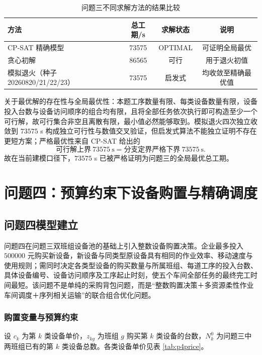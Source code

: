 \documentclass[12pt,a4paper]{article}
\begin{document}
\begin{table}[H]
\centering
\caption{问题三不同求解方法的结果比较}
\small
\label{tab:p3compare}
\begin{tabular}{lccc}
\toprule
方法 & 总工期/s & 求解状态 & 说明 \\
\midrule
CP-SAT 精确模型 & 73575 & OPTIMAL & 可证明全局最优 \\
贪心初解 & 86565 & 可行 & 用于退火初值 \\
模拟退火（种子 20260820/21/22/23） & 73575 & 启发式 & 均收敛至精确最优值 \\
\bottomrule
\end{tabular}
\end{table}

关于最优解的存在性与全局最优性：本题工序数量有限、每类设备数量有限，设备投入台数与设备访问顺序的组合均有限，且将全部任务依次执行即可构造至少一个可行解，故可行集合非空且离散有限，最小值必然能够取到。模拟退火四次独立收敛到 $73575$ s 构成独立可行性与数值交叉验证，但启发式算法不能独立证明不存在更短方案；严格最优性来自 CP-SAT 给出的
\begin{equation}
\text{可行解上界}\ 73575\ \text{s}=\text{分支定界严格下界}\ 73575\ \text{s}.
\end{equation}
故在当前建模口径下，$73575$ s 已被严格证明为问题三的全局最优总工期。

\section{问题四：预算约束下设备购置与精确调度}

\subsection{问题四模型建立}

问题四在问题三双班组设备池的基础上引入整数设备购置决策。企业最多投入 $500000$ 元购买新设备，新设备与同类型原设备具有相同的作业效率、移动速度与使用规则；需同时决定各类型设备的购买数量与所属班组、每道工序的投入台数、具体设备编号、设备访问顺序及工序起止时刻，使五个车间全部任务的最终完工时间最短。该问题不是单纯的采购背包问题，而是“整数购置决策＋多资源柔性作业车间调度＋序列相关运输”的联合组合优化问题。

\subsubsection{购置变量与预算约束}

设 $c_k$ 为第 $k$ 类设备单价，$z_{kg}$ 为班组 $g$ 购买第 $k$ 类设备的台数，$N_k^0$ 为问题三中两班组已有的第 $k$ 类设备总数。各类设备单价见表 \ref{tab:p4price}。
\end{document}
